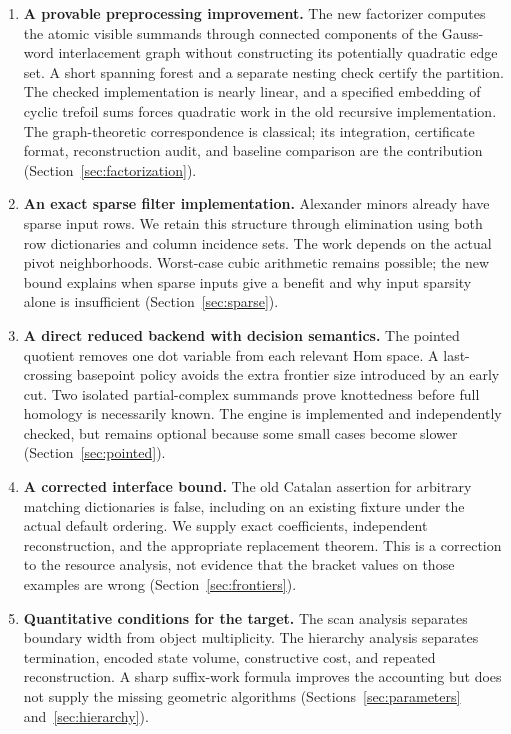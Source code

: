 \documentclass[11pt,a4paper]{article}
\theoremstyle{definition}
\theoremstyle{remark}
\begin{document}
\begin{enumerate}[leftmargin=*,label=\arabic*.]
\item \textbf{A provable preprocessing improvement.}  The new factorizer
computes the atomic visible summands through connected components of the
Gauss-word interlacement graph without constructing its potentially quadratic
edge set.  A short spanning forest and a separate nesting check certify the
partition.  The checked implementation is nearly linear, and a specified
embedding of cyclic trefoil sums forces quadratic work in the old recursive
implementation.  The graph-theoretic correspondence is classical; its
integration, certificate format, reconstruction audit, and baseline comparison
are the contribution (Section~\ref{sec:factorization}).

\item \textbf{An exact sparse filter implementation.}  Alexander minors
already have sparse input rows.  We retain this structure through elimination
using both row dictionaries and column incidence sets.  The work depends on
the actual pivot neighborhoods.  Worst-case cubic arithmetic remains possible;
the new bound explains when sparse inputs give a benefit and why input sparsity
alone is insufficient (Section~\ref{sec:sparse}).

\item \textbf{A direct reduced backend with decision semantics.}  The pointed
quotient removes one dot variable from each relevant Hom space.  A last-crossing
basepoint policy avoids the extra frontier size introduced by an early cut.
Two isolated partial-complex summands prove knottedness before full homology
is necessarily known.  The engine is implemented and independently checked,
but remains optional because some small cases become slower
(Section~\ref{sec:pointed}).

\item \textbf{A corrected interface bound.}  The old Catalan assertion for
arbitrary matching dictionaries is false, including on an existing fixture
under the actual default ordering.  We supply exact coefficients, independent
reconstruction, and the appropriate replacement theorem.  This is a correction
to the resource analysis, not evidence that the bracket values on those
examples are wrong (Section~\ref{sec:frontiers}).

\item \textbf{Quantitative conditions for the target.}  The scan analysis
separates boundary width from object multiplicity.  The hierarchy analysis
separates termination, encoded state volume, constructive cost, and repeated
reconstruction.  A sharp suffix-work formula improves the accounting but
does not supply the missing geometric algorithms
(Sections~\ref{sec:parameters} and~\ref{sec:hierarchy}).
\end{enumerate}
\end{document}
